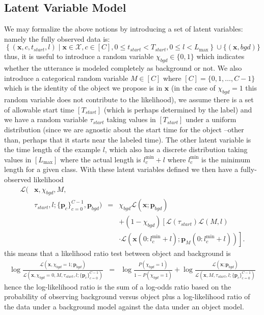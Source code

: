 \documentclass{article}
\begin{document}
\subsection{Latent Variable Model}

We may formalize the above notions by introducing a set of latent variables:
namely the fully observed data is:
$$ \left\{(\mathbf{x},c,t_{start},l)\mid \mathbf{x}\in \mathcal{X},c\in [C],0\leq t_{start}<T_{start},0\leq l< L_{\max}\right\} \cup \{(\mathbf{x},bgd)\} $$
thus, it is useful to introduce a random variable $\chi_{bgd}\in \{0,1\}$ which indicates
whether the utterance is modeled completely as background or not.  We
also introduce a categorical random variable $M\in [C]$ where $[C]=\{0,1,\ldots,C-1\}$ which is the identity of the object we propose is in $\mathbf{x}$ (in the case of $\chi_{bgd}=1$ this random variable does not contribute to the
likelihood), we assume there is a set of allowable start time $[T_{start}]$
(which is perhaps determined by the label) and we have a random variable
$\tau_{start}$ taking values in $[T_{start}]$ under a uniform distribution (since we are agnostic about the start time for the object --other than, perhaps that it starts near the labeled time). The other latent variable is the time
length of the example $l$, which also has a discrete distribution
taking values in $[L_{\max}]$ where the actual length is $l_c^{\min}+l$ where
$l_c^{\min}$ is the minimum length for a given class. With these latent
variables defined we then have a fully-observed likelihood
\begin{equation}\label{eq-fully_observed_likelihood}
\begin{array}{clcl}
\mathcal{L}(&\mathbf{x},\chi_{bgd},M,&&\\
&\tau_{start},l; \{\mathbf{p}_c\}_{c=0}^{C-1},\mathbf{p}_{bgd}) &=& \chi_{bgd}\mathcal{L}(\mathbf{x}; \mathbf{p}_{bgd})\\
&&&+(1-\chi_{bgd})\left[\mathcal{L}(\tau_{start})\mathcal{L}(M,l)\right.\\
&&&\left. \cdot \mathcal{L}(\mathbf{x}(0:l_c^{\min}+l); \mathbf{p}_M(0:l_c^{\min}+l))\right].
\end{array}
\end{equation}
this means that a likelihood ratio test between object and background is
\begin{equation}
\begin{array}{rcl}
\log\frac{\mathcal{L}(\mathbf{x},\chi_{bgd}=1;\mathbf{p}_{bgd})}
{\mathcal{L}(\mathbf{x},\chi_{bgd}=0,M,\tau_{start},l; \{\mathbf{p}_c\}_{c=0}^{C-1})} &=& \log \frac{P(\chi_{bgd}=1)}{1-P(\chi_{bgd}=1)}+\log\frac{\mathcal{L}(\mathbf{x};\mathbf{p}_{bgd})}
{\mathcal{L}(\mathbf{x},M,\tau_{start},l; \{\mathbf{p}_c\}_{c=0}^{C-1})}
\end{array}
\end{equation}
hence the log-likelihood ratio is the sum of a log-odds ratio based on the probability of observing background versus object plus a log-likelihood ratio of the data under a background model against the data under an object model.
\end{document}
